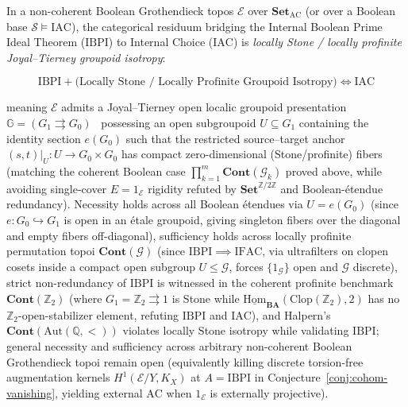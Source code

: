 \begin{conjecture}\label{conj:bpi-ac}

In a non-coherent Boolean Grothendieck topos $\mathcal{E}$ over $\mathbf{Set}_{\mathrm{AC}}$ (or over a Boolean base $\mathcal{S} \models \mathrm{IAC}$), the categorical residuum bridging the Internal Boolean Prime Ideal Theorem ($\mathrm{IBPI}$) to Internal Choice ($\mathrm{IAC}$) is \emph{locally Stone / locally profinite Joyal--Tierney groupoid isotropy}:

\[
  \mathrm{IBPI} + \bigl(\text{Locally Stone / Locally Profinite Groupoid Isotropy}\bigr) \iff \mathrm{IAC}
\]

meaning $\mathcal{E}$ admits a Joyal--Tierney open localic groupoid presentation $\mathbb{G} = (G_1 \rightrightarrows G_0)$~\cite[\S C5.3]{Johnstone02} possessing an open subgroupoid $U \subseteq G_1$ containing the identity section $e(G_0)$ such that the restricted source--target anchor $(s, t)|_U : U \to G_0 \times G_0$ has compact zero-dimensional (Stone/profinite) fibers (matching the coherent Boolean case $\prod_{k=1}^m \mathbf{Cont}(\mathcal{G}_k)$ proved above, while avoiding single-cover $E = 1_{\mathcal{E}}$ rigidity refuted by $\mathbf{Set}^{\mathbb{Z}/2\mathbb{Z}}$ and Boolean-\'etendue redundancy). Necessity holds across all Boolean \'etendues via $U = e(G_0)$ (since $e : G_0 \hookrightarrow G_1$ is open in an \'etale groupoid, giving singleton fibers over the diagonal and empty fibers off-diagonal), sufficiency holds across locally profinite permutation topoi $\mathbf{Cont}(\mathcal{G})$ (since $\mathrm{IBPI} \implies \mathrm{IFAC}$, via ultrafilters on clopen cosets inside a compact open subgroup $U \le \mathcal{G}$, forces $\{1_{\mathcal{G}}\}$ open and $\mathcal{G}$ discrete), strict non-redundancy of $\mathrm{IBPI}$ is witnessed in the coherent profinite benchmark $\mathbf{Cont}(\mathbb{Z}_2)$ (where $G_1 = \mathbb{Z}_2 \rightrightarrows 1$ is Stone while $\underline{\mathrm{Hom}}_{\mathbf{BA}}(\mathrm{Clop}(\mathbb{Z}_2), 2)$ has no $\mathbb{Z}_2$-open-stabilizer element, refuting $\mathrm{IBPI}$ and $\mathrm{IAC}$), and Halpern's $\mathbf{Cont}(\mathrm{Aut}(\mathbb{Q}, <))$ violates locally Stone isotropy while validating $\mathrm{IBPI}$; general necessity and sufficiency across arbitrary non-coherent Boolean Grothendieck topoi remain open (equivalently killing discrete torsion-free augmentation kernels $H^1(\mathcal{E}/Y, K_X)$ at $A = \mathrm{IBPI}$ in Conjecture~\ref{conj:cohom-vanishing}, yielding external $\mathrm{AC}$ when $1_{\mathcal{E}}$ is externally projective).

\end{conjecture}

